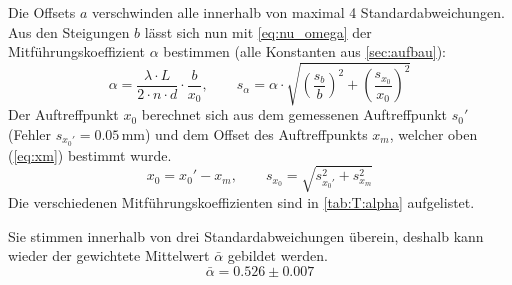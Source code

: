 

Die Offsets $a$ verschwinden alle innerhalb von maximal 4 Standardabweichungen. Aus den Steigungen $b$ lässt sich nun mit \autoref{eq:nu_omega} 
der Mitführungskoeffizient $\alpha$ bestimmen (alle Konstanten aus \autoref{sec:aufbau}):
\begin{equation}
  \alpha = \frac{\lambda \cdot L}{2 \cdot n \cdot d} \cdot \frac{b}{x_0}, \qquad
  s_\alpha = \alpha \cdot \sqrt{ \left( \frac{s_b}{b} \right)^2 + \left( \frac{s_{x_0}}{x_0} \right)^2 }
\end{equation}
Der Auftreffpunkt $x_0$ berechnet sich aus dem gemessenen Auftreffpunkt $s_0'$ (Fehler $s_{x_0'} = 0.05$\,mm) und dem 
Offset des Auftreffpunkts $x_m$, welcher oben (\autoref{eq:xm}) bestimmt wurde.
\begin{equation}
  x_0 = x_0' - x_m, \qquad s_{x_0} = \sqrt{s_{x_0'}^2 + s_{x_m}^2}
\end{equation}
Die verschiedenen Mitführungskoeffizienten sind in \autoref{tab:T:alpha} aufgelistet.

Sie stimmen innerhalb von drei Standardabweichungen überein, deshalb kann wieder der gewichtete Mittelwert $\bar{\alpha}$ gebildet werden.
\begin{equation}
  \bar{\alpha} = 0.526 \pm 0.007
\end{equation}

